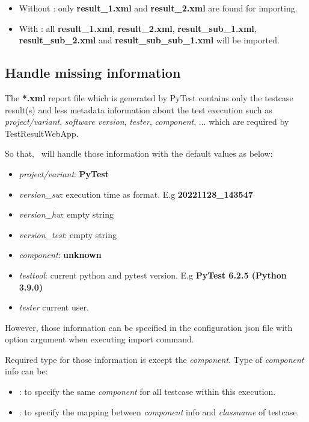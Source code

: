\begin{itemize}
\tightlist
\item
  Without : only \textbf{result\_1.xml} and
  \textbf{result\_2.xml} are found for importing.
\item
  With : all \textbf{result\_1.xml},
  \textbf{result\_2.xml}, \textbf{result\_sub\_1.xml},
  \textbf{result\_sub\_2.xml} and \textbf{result\_sub\_sub\_1.xml} will
  be imported.
\end{itemize}

\hypertarget{handle-missing-information}{%
\subsection{Handle missing
information}\label{handle-missing-information}}

The \textbf{*.xml} report file which is generated by PyTest contains
only the testcase result(s) and less metadata information about the test
execution such as \emph{project/variant}, \emph{software version},
\emph{tester}, \emph{component}, ... which are required by
TestResultWebApp.

So that, \pkg\ will handle those information with the default
values as below:

\begin{itemize}
\tightlist
\item
  \emph{project/variant}: \textbf{PyTest}
\item
  \emph{version\_sw}: execution time as 
  format. E.g \textbf{20221128\_143547}
\item
  \emph{version\_hw}: empty string
\item
  \emph{version\_test}: empty string
\item
  \emph{component}: \textbf{unknown}
\item
  \emph{testtool}: current python and pytest version. E.g
  \textbf{PyTest 6.2.5 (Python 3.9.0)}
\item
  \emph{tester} current user.
\end{itemize}

However, those information can be specified in the configuration json
file with option argument  when executing import
command.

Required type for those information is  except the
\emph{component}. Type of \emph{component} info can be:

\begin{itemize}
\tightlist
\item
  : to specify the same \emph{component} for all testcase
  within this execution.
\item
  : to specify the mapping between \emph{component} info
  and \emph{classname} of testcase.
\end{itemize}

